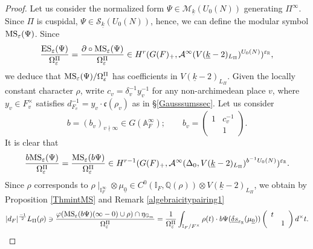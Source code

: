 \documentclass{amsart}
\theoremstyle{definition}
\theoremstyle{remark}
\numberwithin{equation}{section}
\newcommand{\Z}{{\mathbb Z}}
\newcommand{\A}{{\mathbb A}}
\newcommand{\Q}{{\mathbb Q}}
\newcommand{\R}{{\mathbb R}}
\newcommand{\G}{{\mathbb G}}
\newcommand{\I}{{\mathbb I}}
\newcommand{\cA}{{\mathcal A}}
\newcommand{\cS}{{\mathcal S}}
\newcommand{\cM}{{\mathcal M}}
\begin{document}
\begin{proof}
Let us consider the normalized form $\Psi\in \cM_{\underline k}(U_0(N))$ generating $\Pi^\infty$. Since $\Pi$ is cuspidal, $\Psi\in \cS_{\underline k}(U_0(N))$, hence, we can define the modular symbol ${\rm MS}_\varepsilon(\Psi)$.
Since
\[
\frac{{\rm ES}_\varepsilon(\Psi)}{\Omega_\varepsilon^\Pi}=\frac{\partial\circ{\rm MS}_\varepsilon(\Psi)}{\Omega_\varepsilon^\Pi}\in H^{r}(G(F)_+,\cA^{\infty}(V(\underline k-2)_{L_\Pi})^{U_0(N)})^{\varepsilon_\R},
\]
we deduce that ${\rm MS}_\varepsilon(\Psi)/\Omega_\varepsilon^\Pi$ has coefficients in $V(\underline{k}-2)_{L_\Pi}$. Given the locally constant character $\rho$, write $c_v=\delta_v^{-1}y_v^{-1}$ for any non-archimedean place $v$, where $y_v\in F_v^\times$ satisfies $d_{F_v}^{-1}=y_v\cdot\mathfrak{c}(\rho_v)$ as in \S\ref{Gausssumssec}. Let us consider 
\[
b=(b_v)_{v\nmid\infty}\in G(\A_F^\infty);\qquad b_v=\left(\begin{array}{cc}
    1&c_v^{-1}\\&1
\end{array}\right).
\]
It is clear that 
\[
\frac{b{\rm MS}_\varepsilon(\Psi)}{\Omega_\varepsilon^\Pi}=\frac{{\rm MS}_\varepsilon(b\Psi)}{\Omega_\varepsilon^\Pi}\in H^{r-1}(G(F)_+,\cA^{\infty}(\Delta_0,V(\underline k-2)_{L_\Pi})^{b^{-1}U_0(N)})^{\varepsilon_\R}.
\]
Since $\rho$ corresponds to $\rho\mid_{\I_F^\infty}\otimes \mu_{\underline{0}}\in C^{0}(\I_F,\Q(\rho))\otimes V(\underline{k}-2)_{L_\Pi}$, we obtain by Proposition \ref{ThmintMS} and Remark \ref{algebraicitypairing1}
\[
|d_F|^{\frac{-1}{2}}L_\Pi(\rho)\ni\frac{\varphi({\rm MS}_\varepsilon(b\Psi)(\infty-0)\cup\rho)\cap \eta_{\G_m}}{\Omega_\varepsilon^\Pi}=\frac{1}{\Omega_\varepsilon^\Pi}\int_{\I_F/F^\times}\rho(t)\cdot b\Psi(\underline{\delta s}_{\varepsilon_\R}(\mu_{\underline{0}}))\left(\begin{array}{cc}
t     &  \\
     & 1
\end{array}\right)d^\times t.
\]



\end{proof}
\end{document}
